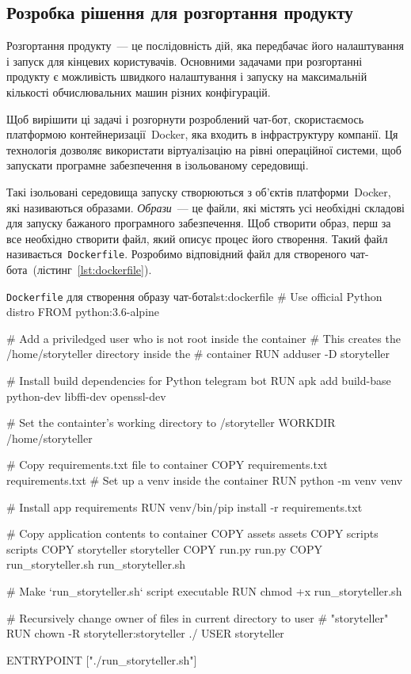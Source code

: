 \documentclass[
	a4paper,
	oneside,
	BCOR = 10mm,
	DIV = 12,
	12pt,
	headings = normal,
]{scrartcl}
\newcommand{\filename}[1]{\texttt{#1}}
\begin{document}
		\subsection{Розробка рішення для розгортання продукту}
			Розгортання продукту~— це послідовність дій, яка передбачає його налаштування і запуск для кінцевих користувачів. Основними задачами при розгортанні продукту є можливість швидкого налаштування і запуску на максимальній кількості обчислювальних машин різних конфігурацій.
			
			Щоб вирішити ці задачі і розгорнути розроблений чат-бот, скористаємось платформою контейнеризації~\textenglish{Docker}, яка входить в інфраструктуру компанії. Ця технологія дозволяє використати віртуалізацію на рівні операційної системи, щоб запускати програмне забезпечення в ізольованому середовищі.

			Такі ізольовані середовища запуску створюються з об'єктів платформи~\textenglish{Docker}, які називаються образами. \emph{Образи}~— це файли, які містять усі необхідні складові для запуску бажаного програмного забезпечення. Щоб створити образ, перш за все необхідно створити файл, який описує процес його створення. Такий файл називається~\filename{\textenglish{Dockerfile}}. Розробимо відповідний файл для створеного чат-бота~(лістинг~\ref{lst:dockerfile}).

			\begin{listingdocker}{\filename{\textenglish{Dockerfile}} для створення образу чат-бота}{lst:dockerfile}
# Use official Python distro
FROM python:3.6-alpine

# Add a priviledged user who is not root inside the container
# This creates the /home/storyteller directory inside the
# container
RUN adduser -D storyteller

# Install build dependencies for Python telegram bot
RUN apk add build-base python-dev libffi-dev openssl-dev

# Set the containter's working directory to /storyteller
WORKDIR /home/storyteller

# Copy requirements.txt file to container
COPY requirements.txt requirements.txt
# Set up a venv inside the container
RUN python -m venv venv

# Install app requirements
RUN venv/bin/pip install -r requirements.txt

# Copy application contents to container
COPY assets assets
COPY scripts scripts
COPY storyteller storyteller
COPY run.py run.py
COPY run_storyteller.sh run_storyteller.sh

# Make `run_storyteller.sh` script executable
RUN chmod +x run_storyteller.sh

# Recursively change owner of files in current directory to user
# "storyteller"
RUN chown -R storyteller:storyteller ./
USER storyteller

ENTRYPOINT ["./run_storyteller.sh"]
			\end{listingdocker}
\end{document}

